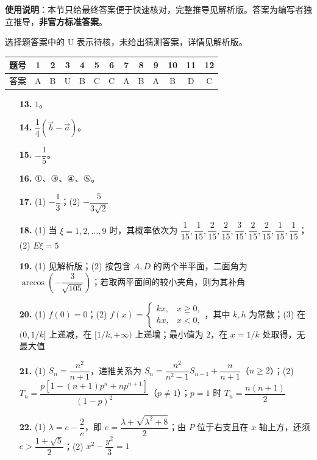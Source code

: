 
\begin{gknotice}
\textbf{使用说明}：本节只给最终答案便于快速核对，完整推导见解析版。答案为编写者独立推导，\textbf{非官方标准答案}。
\end{gknotice}

\begin{gknotice}
选择题答案中的 U 表示待核，未给出猜测答案，详情见解析版。
\end{gknotice}

\begin{center}\begin{tabular}{ccccccccccccc}
\toprule
题号 & 1 & 2 & 3 & 4 & 5 & 6 & 7 & 8 & 9 & 10 & 11 & 12 \\
\midrule
答案 & A & B & U & B & C & C & A & B & A & B & D & C \\
\bottomrule
\end{tabular}\end{center}

\begin{itemize}[leftmargin=2.6em]
  \item[\textbf{13.}] $1$。
  \item[\textbf{14.}] $\dfrac14(\vec b-\vec a)$。
  \item[\textbf{15.}] $-\dfrac15$。
  \item[\textbf{16.}] ①、③、④、⑤。
\end{itemize}

\begin{itemize}[leftmargin=2.6em]
  \item[\textbf{17.}] (1) $-\dfrac13$；(2) $-\dfrac{5}{3\sqrt2}$
  \item[\textbf{18.}] (1) 当 $\xi=1,2,\ldots,9$ 时，其概率依次为 $\dfrac1{15},\dfrac1{15},\dfrac2{15},\dfrac2{15},\dfrac3{15},\dfrac2{15},\dfrac2{15},\dfrac1{15},\dfrac1{15}$；(2) $E\xi=5$
  \item[\textbf{19.}] (1) 见解析版；(2) 按包含 $A,D$ 的两个半平面，二面角为 $\arccos\left(-\dfrac3{\sqrt{105}}\right)$；若取两平面间的较小夹角，则为其补角
  \item[\textbf{20.}] (1) $f(0)=0$；(2) $f(x)=\begin{cases}kx,&x\geqslant0,\\hx,&x<0,\end{cases}$，其中 $k,h$ 为常数；(3) 在 $(0,1/k]$ 上递减，在 $[1/k,+\infty)$ 上递增；最小值为 $2$，在 $x=1/k$ 处取得，无最大值
  \item[\textbf{21.}] (1) $S_n=\dfrac{n^2}{n+1}$，递推关系为 $S_n=\dfrac{n^2}{n^2-1}S_{n-1}+\dfrac{n}{n+1}$（$n\geqslant2$）；(2) $T_n=\dfrac{p\left[1-(n+1)p^n+np^{n+1}\right]}{(1-p)^2}$（$p\ne1$）；$p=1$ 时 $T_n=\dfrac{n(n+1)}2$
  \item[\textbf{22.}] (1) $\lambda=e-\dfrac2e$，即 $e=\dfrac{\lambda+\sqrt{\lambda^2+8}}2$；由 $P$ 位于右支且在 $x$ 轴上方，还须 $e>\dfrac{1+\sqrt5}{2}$；(2) $x^2-\dfrac{y^2}{3}=1$
\end{itemize}
